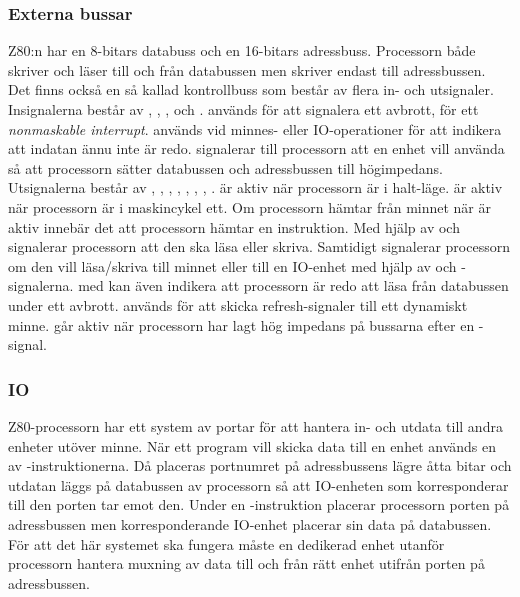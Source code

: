 \documentclass[main.tex]{subfiles}
\begin{document}
\subsubsection{Externa bussar}
Z80:n har en 8-bitars databuss och en 16-bitars adressbuss. Processorn både
skriver och läser till och från databussen men skriver endast till
adressbussen. Det finns också en så kallad kontrollbuss som består av flera in-
och utsignaler. Insignalerna består av , , ,
 och .  används för att signalera ett
avbrott,  för ett {\it nonmaskable interrupt}.  används
vid minnes- eller IO-operationer för att indikera att indatan ännu inte är
redo.  signalerar till processorn att en enhet vill använda så att
processorn sätter databussen och adressbussen till högimpedans. Utsignalerna
består av , , , , ,
, , .  är aktiv när processorn är i
halt-läge.  är aktiv när processorn är i maskincykel ett. Om
processorn hämtar från minnet när  är aktiv innebär det att processorn
hämtar en instruktion. Med hjälp av  och  signalerar
processorn att den ska läsa eller skriva. Samtidigt signalerar processorn om
den vill läsa/skriva till minnet eller till en IO-enhet med hjälp av
 och -signalerna.  med  kan även
indikera att processorn är redo att läsa från databussen under ett avbrott.
 används för att skicka refresh-signaler till ett dynamiskt minne.
 går aktiv när processorn har lagt hög impedans på bussarna efter
en -signal.

\subsubsection{IO}
Z80-processorn har ett system av portar för att hantera in- och utdata till
andra enheter utöver minne. När ett program vill skicka data till en enhet
används en av -instruktionerna. Då placeras portnumret på
adressbussens lägre åtta bitar och utdatan läggs på databussen av processorn så
att IO-enheten som korresponderar till den porten tar emot den. Under en
-instruktion placerar processorn porten på adressbussen men
korresponderande IO-enhet placerar sin data på databussen. För att det här
systemet ska fungera måste en dedikerad enhet utanför processorn hantera
muxning av data till och från rätt enhet utifrån porten på adressbussen.
\end{document}

